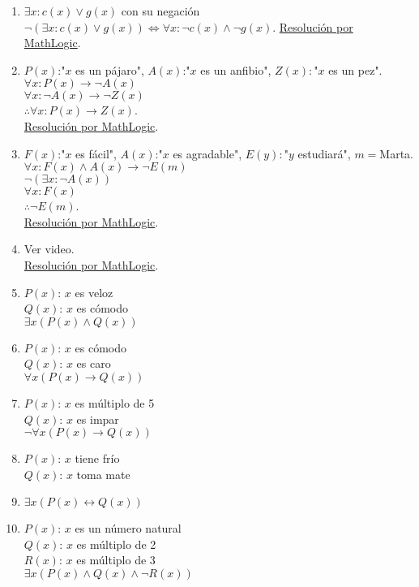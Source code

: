 \documentclass[a4paper]{article}
\newcommand{\then}{\to}
\newcommand{\eq}{\leftrightarrow}
\newcommand{\Eq}{\Leftrightarrow}
\begin{document}
\begin{enumerate}
\begin{enumerate} [label=(\alph*)]
		\item $\exists x: c(x) \lor g (x)$ con su negación $\neg \left(\exists x: c(x) \lor g (x)\right) \Eq \forall x: \neg c(x) \land \neg g(x)$. \href{https://youtu.be/rnaCiSpVtP4}{Resolución por MathLogic}.
		\item $P(x)$:"$x$ es un pájaro", $A(x)$:"$x$ es un anfibio", $Z(x):$"$x$ es un pez".\\ $\forall x: P(x) \then \neg A(x)$ \\ $\forall x: \neg A(x) \then \neg Z(x)$ \\ $\therefore \forall x: P(x) \then Z(x)$. \\\href{https://youtu.be/M71MEB3TkVw?t=32}{Resolución por MathLogic}.
		\item $F(x)$:"$x$ es fácil", $A(x)$:"$x$ es agradable", $E(y):$"$y$ estudiará", $m=$Marta.\\ $\forall x: F(x) \land A(x) \then \neg E(m)$ \\ $\neg \left( \exists x: \neg A(x) \right)$ \\ $\forall x: F(x)$ \\ $\therefore \neg E(m)$. \\\href{https://youtu.be/M71MEB3TkVw?t=736}{Resolución por MathLogic}.
		\item Ver video. \\\href{https://youtu.be/M71MEB3TkVw?t=1191}{Resolución por MathLogic}.
		\item $P(x)$: $x$ es veloz \\ $Q(x)$: $x$ es cómodo \\ $\exists x ( P(x) \land  Q(x) )$
		\item $P(x)$: $x$ es cómodo \\ $Q(x)$: $x$ es caro  \\ $\forall x ( P(x) \then  Q(x) )$
		\item $P(x)$: $x$ es múltiplo de 5 \\ $Q(x)$: $x$ es impar \\ $\neg \forall x ( P(x) \then  Q(x) )$
		\item $P(x)$: $x$ tiene frío  \\ $Q(x)$: $x$ toma mate \\ \item $\exists x ( P(x) \eq  Q(x) )$
		\item $P(x)$: $x$ es un número natural  \\ $Q(x)$: $x$ es múltiplo de 2 \\ $R(x)$: $x$ es múltiplo de 3 \\ $\exists x ( P(x) \land  Q(x) \land  \neg R(x) )$

\end{enumerate}
\end{enumerate}
\end{document}
